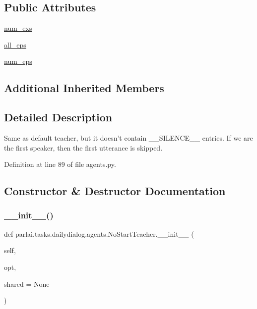 \subsection*{Public Attributes}
\begin{DoxyCompactItemize}
\item 
\hyperlink{classparlai_1_1tasks_1_1dailydialog_1_1agents_1_1NoStartTeacher_aab39a1a4cec18469e61f2431e85b6fd1}{num\+\_\+exs}
\item 
\hyperlink{classparlai_1_1tasks_1_1dailydialog_1_1agents_1_1NoStartTeacher_adb1dd6164639fbe3d4bf53a26f0431ee}{all\+\_\+eps}
\item 
\hyperlink{classparlai_1_1tasks_1_1dailydialog_1_1agents_1_1NoStartTeacher_ac31b7ae1fa0c534af1530fe395d90252}{num\+\_\+eps}
\end{DoxyCompactItemize}
\subsection*{Additional Inherited Members}


\subsection{Detailed Description}
\begin{DoxyVerb}Same as default teacher, but it doesn't contain __SILENCE__ entries.
If we are the first speaker, then the first utterance is skipped.
\end{DoxyVerb}
 

Definition at line 89 of file agents.\+py.



\subsection{Constructor \& Destructor Documentation}
\mbox{\label{classparlai_1_1tasks_1_1dailydialog_1_1agents_1_1NoStartTeacher_aa9ca29c5550b1ec3fe80c7254e36aead}} 
\subsubsection{\texorpdfstring{\+\_\+\+\_\+init\+\_\+\+\_\+()}{\_\_init\_\_()}}
{\footnotesize\ttfamily def parlai.\+tasks.\+dailydialog.\+agents.\+No\+Start\+Teacher.\+\_\+\+\_\+init\+\_\+\+\_\+ (\begin{DoxyParamCaption}\item[{}]{self,  }\item[{}]{opt,  }\item[{}]{shared = {\ttfamily None} }\end{DoxyParamCaption})}



